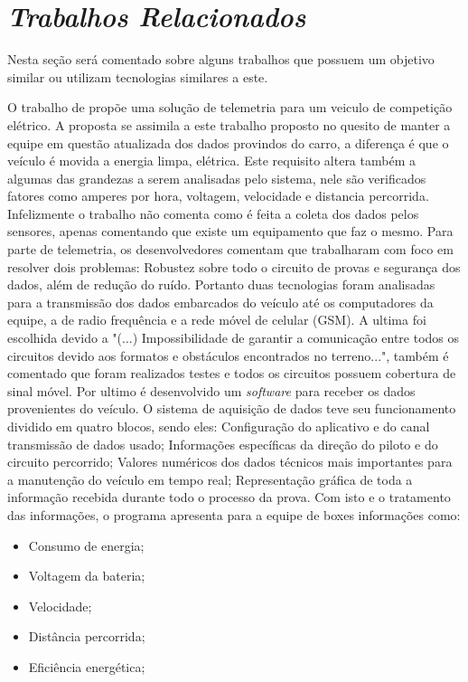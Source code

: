 \chapter{\textit{Trabalhos Relacionados}}
	\label{ch:trabalhos}
Nesta seção será comentado sobre alguns trabalhos que possuem um objetivo similar ou utilizam tecnologias similares a este. 

O trabalho de \cite{gprsTelemetrySystem2013} propõe uma solução de telemetria para um veiculo de competição elétrico. A proposta se assimila a este trabalho proposto no quesito de manter a equipe em questão atualizada dos dados provindos do carro, a diferença é que o veículo é movida a energia limpa, elétrica. Este requisito altera também a algumas das grandezas a serem analisadas pelo sistema, nele são verificados fatores como amperes por hora, voltagem, velocidade e distancia percorrida. Infelizmente o trabalho não comenta como é feita a coleta dos dados pelos sensores, apenas comentando que existe um equipamento que faz o mesmo. Para parte de telemetria, os desenvolvedores comentam que trabalharam com foco em resolver dois problemas: Robustez sobre todo o circuito de provas e segurança dos dados, além de redução do ruído. Portanto duas tecnologias foram analisadas para a transmissão dos dados embarcados do veículo até os computadores da equipe, a de radio frequência e a rede móvel de celular (GSM). A ultima foi escolhida devido a "(...) Impossibilidade de garantir a comunicação entre todos os circuitos devido aos formatos e obstáculos encontrados no terreno...", também é comentado que foram realizados testes e todos os circuitos possuem cobertura de sinal móvel. Por ultimo é desenvolvido um \textit{software} para receber os dados provenientes do veículo. O sistema de aquisição de dados teve seu funcionamento dividido em quatro blocos, sendo eles: Configuração do aplicativo e do canal transmissão de dados usado; Informações específicas da direção do piloto e do circuito percorrido; Valores numéricos dos dados técnicos mais importantes para a manutenção do veículo em tempo real; Representação gráfica de toda a informação recebida durante todo o processo da prova. Com isto e o tratamento das informações, o programa apresenta para a equipe de boxes informações como:

\begin{itemize}
	\item Consumo de energia; 
	\item Voltagem da bateria;
	\item Velocidade;
	\item Distância percorrida;
	\item Eficiência energética; 
\end{itemize}

